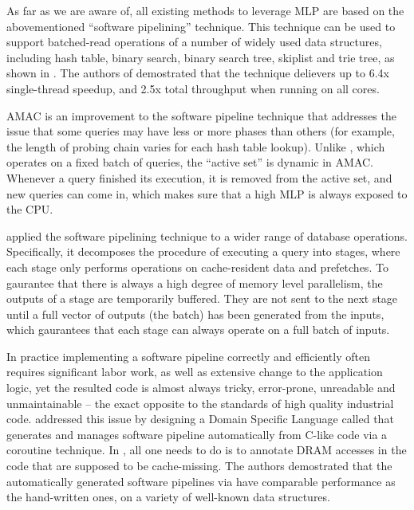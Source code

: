 \documentclass[11pt, usletter]{article}
\begin{document}
As far as we are aware of, all existing methods to leverage MLP are based on the abovementioned ``software pipelining'' technique.
This technique can be used to support batched-read operations of a number of widely used data structures, 
including hash table, binary search, binary search tree, skiplist and trie tree, as shown in \cite{cimple_pact18, fast_sigmod10}.
The authors of \cite{cimple_pact18} demostrated that the technique delievers up to 6.4x single-thread speedup, 
and 2.5x total throughput when running on all cores.

AMAC \cite{amac_vldb15} is an improvement to the software pipeline technique 
that addresses the issue that some queries may have less or more phases than others 
(for example, the length of probing chain varies for each hash table lookup). 
Unlike \cite{hashjoin_icde04}, which operates on a fixed batch of queries, the ``active set'' is dynamic in AMAC. 
Whenever a query finished its execution, it is removed from the active set, and new queries can come in, 
which makes sure that a high MLP is always exposed to the CPU.

\cite{operatorfusion_vldb17} applied the software pipelining technique to a wider range of database operations. 
Specifically, it decomposes the procedure of executing a query into stages, 
where each stage only performs operations on cache-resident data and prefetches. 
To gaurantee that there is always a high degree of memory level parallelism, the outputs of a stage are temporarily buffered. 
They are not sent to the next stage until a full vector of outputs (the batch) has been generated from the inputs, 
which gaurantees that each stage can always operate on a full batch of inputs.

In practice implementing a software pipeline correctly and efficiently 
often requires significant labor work, as well as extensive change to the application logic, 
yet the resulted code is almost always tricky, error-prone, unreadable and unmaintainable -- 
the exact opposite to the standards of high quality industrial code. 
\cite{cimple_pact18} addressed this issue by
designing a Domain Specific Language called \Cimple that generates and manages software pipeline automatically from C-like code
via a coroutine technique. 
In \Cimple, all one needs to do is to annotate
DRAM accesses in the code that are supposed to be cache-missing.
The authors demostrated that the automatically generated software pipelines via \Cimple have comparable performance as the hand-written ones, 
on a variety of well-known data structures.
\end{document}
